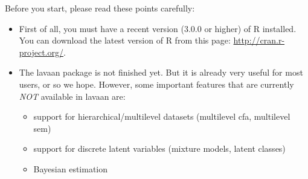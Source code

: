 Before you start, please read these points carefully:

\begin{itemize}
\item
  First of all, you must have a recent version ($3.0.0$ or higher) of R
  installed. You can download the latest version of R from this page:
  \url{http://cran.r-project.org/}.
\item
  The lavaan package is not finished yet. But it is already very useful
  for most users, or so we hope. However, some important features that
  are currently \emph{NOT} available in lavaan are:

  \begin{itemize}
  \item
    support for hierarchical/multilevel datasets (multilevel cfa,
    multilevel sem)
  \item
    support for discrete latent variables (mixture models, latent
    classes)
  \item
    Bayesian estimation
  \end{itemize}


\end{itemize}
